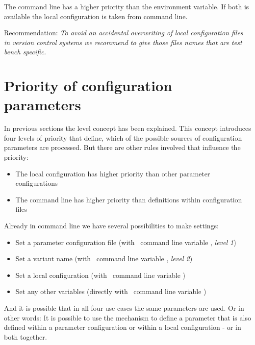 The command line has a higher priority than the environment variable. If both is available the local configuration is taken from command line.

Recommendation: \textit{To avoid an accidental overwriting of local configuration files in version control systems we recommend to give those files
names that are test bench specific.}

\newpage

\section{Priority of configuration parameters}

In previous sections the level concept has been explained. This concept introduces four levels of priority
that define, which of the possible sources of configuration parameters are processed.
But there are other rules involved that influence the priority:

\begin{itemize}
   \item The local configuration has higher priority than other parameter configurations
   \item The command line has higher priority than definitions within configuration files
\end{itemize}

Already in command line we have several possibilities to make settings:

\begin{itemize}
   \item Set a parameter configuration file (with \pkg\ command line variable , \textit{level 1})
   \item Set a variant name (with \pkg\ command line variable , \textit{level 2})
   \item Set a local configuration (with \pkg\ command line variable )
   \item Set any other variables (directly with \rfwcore\ command line variable )
\end{itemize}

And it is possible that in all four use cases the same parameters are used. Or in other words: It is possible to use the
 mechanism to define a parameter that is also defined within a parameter configuration or within a
local configuration - or in both together.

